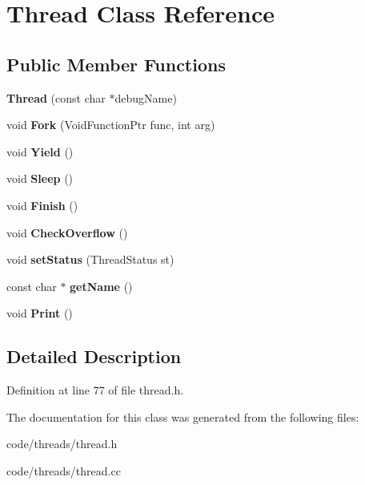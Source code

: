 \section{Thread Class Reference}
\label{class_thread}
\subsection*{Public Member Functions}
\begin{DoxyCompactItemize}
\item 
{\bfseries Thread} (const char $\ast$debug\+Name)\label{class_thread_aeef00ecb5eda30734cff97a0ac492bdd}

\item 
void {\bfseries Fork} (Void\+Function\+Ptr func, int arg)\label{class_thread_a7631955bc5e11232bb682baa467baf5f}

\item 
void {\bfseries Yield} ()\label{class_thread_adbc2bfb172d2eff4b46882aade9eeb8a}

\item 
void {\bfseries Sleep} ()\label{class_thread_a187a4c1e62087511b69068220840244a}

\item 
void {\bfseries Finish} ()\label{class_thread_a1e43c788c40e9783311c970bcea7239b}

\item 
void {\bfseries Check\+Overflow} ()\label{class_thread_afa6657ff14b9c6866eadd85ea32c9147}

\item 
void {\bfseries set\+Status} (Thread\+Status st)\label{class_thread_a39061ce2692542188f82f909d005b1c3}

\item 
const char $\ast$ {\bfseries get\+Name} ()\label{class_thread_aed303e0688ec792e41fb9b7429a3d948}

\item 
void {\bfseries Print} ()\label{class_thread_ad707af00a9ce1a1d324804e7c73dc4ab}

\end{DoxyCompactItemize}


\subsection{Detailed Description}


Definition at line 77 of file thread.\+h.



The documentation for this class was generated from the following files\+:\begin{DoxyCompactItemize}
\item 
code/threads/thread.\+h\item 
code/threads/thread.\+cc\end{DoxyCompactItemize}
